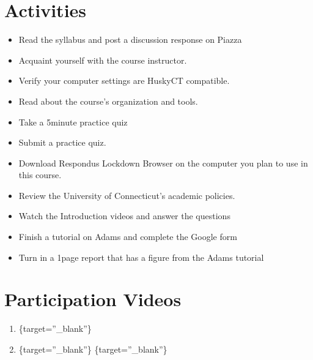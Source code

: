 \documentclass[letterpaper,10pt,english]{sphinxmanual}
\begin{document}
\section{Activities}
\label{\detokenize{module_00/introduction:activities}}\begin{itemize}
\item {} 
Read the syllabus and post a discussion response on Piazza

\item {} 
Acquaint yourself with the course instructor.

\item {} 
Verify your computer settings are HuskyCT compatible.

\item {} 
Read about the course’s organization and tools.

\item {} 
Take a 5\sphinxhyphen{}minute practice quiz

\item {} 
Submit a practice quiz.

\item {} 
Download Respondus Lockdown Browser on the computer you plan to use in this
course.

\item {} 
Review the University of Connecticut’s academic policies.

\item {} 
Watch the Introduction videos and answer the questions

\item {} 
Finish a tutorial on Adams and complete the Google form

\item {} 
Turn in a 1\sphinxhyphen{}page report that has a figure from the Adams tutorial

\end{itemize}




\section{Participation Videos}
\label{\detokenize{module_00/participation:participation-videos}}\label{\detokenize{module_00/participation::doc}}\begin{enumerate}
%
\item {} 
\{target=”\_blank”\}

\item {} 
\{target=”\_blank”\}
\{target=”\_blank”\}

\end{enumerate}
\end{document}

